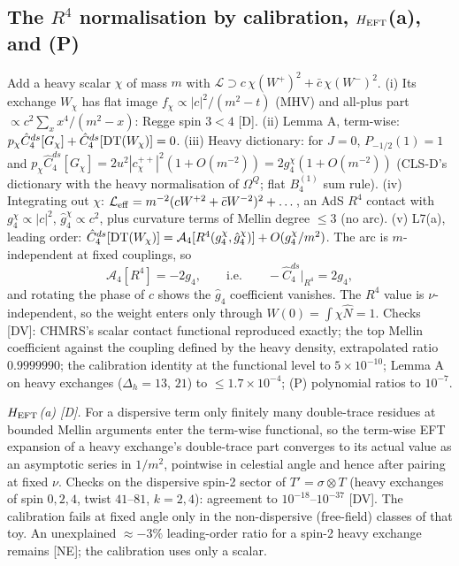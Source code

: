 \documentclass[aps,prl,onecolumn,superscriptaddress,nofootinbib]{revtex4-2}
\begin{document}
\subsection{The \texorpdfstring{$R^4$}{R4} normalisation by calibration, \texorpdfstring{$H_{\rm EFT}$}{H\_EFT}(a), and (P)}
\label{sec:F}
Add a heavy scalar $\chi$ of mass $m$ with $\mathcal L\supset c\,\chi(W^+)^2+\bar c\,\chi(W^-)^2$.
(i) Its exchange $W_\chi$ has flat image $f_\chi\propto|c|^2/(m^2-t)$ (MHV) and all-plus part
$\propto c^2\sum_xx^4/(m^2-x)$: Regge spin $3<4$ [D]. (ii) Lemma A, term-wise:
$p_\chi\hat C_4^{ds}[G_\chi]+\hat C_4^{ds}[{\rm DT}(W_\chi)]=0$. (iii) Heavy dictionary: for
$J=0$, $P_{-1/2}(1)=1$ and $p_\chi\hat C_4^{ds}[G_\chi]=2u^2|c^{++}_\chi|^2(1+O(m^{-2}))=2g_4^\chi(1+O(m^{-2}))$
(CLS-D's dictionary with the heavy normalisation of $\Omega^Q$; flat $B_4^{(1)}$ sum rule).
(iv) Integrating out $\chi$: $\mathcal L_{\rm eff}=m^{-2}(cW^{+2}+\bar cW^{-2})^2+\dots$, an AdS $R^4$
contact with $g_4^\chi\propto|c|^2$, $\hat g_4^\chi\propto c^2$, plus curvature terms of Mellin
degree $\le3$ (no arc). (v) L7(a), leading order:
$\hat C_4^{ds}[{\rm DT}(W_\chi)]=\mathcal A_4[R^4(g_4^\chi,\hat g_4^\chi)]+O(g_4^\chi/m^2)$. The arc is
$m$-independent at fixed couplings, so
\begin{equation}
\mathcal A_4[R^4]=-2g_4,\qquad\text{i.e.}\qquad -\hat C_4^{ds}|_{R^4}=2g_4 ,
\end{equation}
and rotating the phase of $c$ shows the $\hat g_4$ coefficient vanishes. The $R^4$ value is
$\nu$-independent, so the weight enters only through $W(0)=\int\chi\hat N=1$. Checks [DV]: CHMRS's
scalar contact functional reproduced exactly; the top Mellin coefficient against the coupling
defined by the heavy density, extrapolated ratio $0.9999990$; the calibration identity at the
functional level to $5\times10^{-10}$; Lemma A on heavy exchanges ($\Delta_h=13$, $21$) to
$\le1.7\times10^{-4}$; (P) polynomial ratios to $10^{-7}$.

\emph{$H_{\rm EFT}$(a) [D].} For a dispersive term only finitely many double-trace residues at bounded Mellin
arguments enter the term-wise functional, so the term-wise EFT expansion of a heavy exchange's double-trace
part converges to its actual value as an asymptotic series in $1/m^2$, pointwise in celestial angle and hence
after pairing at fixed $\nu$. Checks on the dispersive spin-2 sector of $T'=\sigma\otimes T$ (heavy exchanges of
spin $0,2,4$, twist $41$--$81$, $k=2,4$): agreement to $10^{-18}$--$10^{-37}$ [DV]. The calibration fails at fixed angle only in the non-dispersive (free-field) classes of that toy. An
unexplained $\approx-3\%$ leading-order ratio for a spin-2 heavy exchange remains [NE]; the calibration
uses only a scalar.
\end{document}
